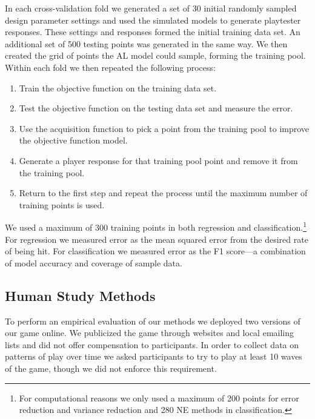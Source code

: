 \documentclass{sig-alternate}
\begin{document}
In each cross-validation fold we generated a set of 30 initial randomly sampled design parameter settings and used the simulated models to generate playtester responses.
These settings and responses formed the initial training data set.
An additional set of 500 testing points was generated in the same way.
We then created the grid of points the AL model could sample, forming the training pool.
Within each fold we then repeated the following process:
\begin{enumerate}
\item Train the objective function on the training data set.
\item Test the objective function on the testing data set and measure the error.
\item Use the acquisition function to pick a point from the training pool to improve the objective function model.
\item Generate a player response for that training pool point and remove it from the training pool.
\item Return to the first step and repeat the process until the maximum number of training points is used.
\end{enumerate}
\noindent We used a maximum of 300 training points in both regression and classification.\footnote{For computational reasons we only used a maximum of 200 points for error reduction and variance reduction and 280 NE methods in classification.}
For regression we measured error as the mean squared error from the desired rate of being hit.
For classification we measured error as the F1 score---a combination of model accuracy and coverage of sample data.



\subsection{Human Study Methods}

To perform an empirical evaluation of our methods we deployed two versions of our game online.
We publicized the game through websites and local emailing lists and did not offer compensation to participants.
In order to collect data on patterns of play over time we asked participants to try to play at least 10 waves of the game, though we did not enforce this requirement.
\end{document}
